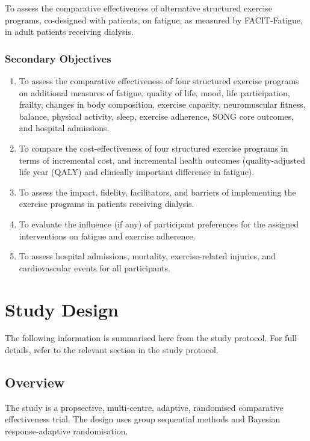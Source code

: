 \documentclass[11pt,parskip=half-]{scrartcl}
\begin{document}
To assess the comparative effectiveness of alternative structured exercise programs, co-designed with patients, on fatigue, as measured by FACIT-Fatigue, in adult patients receiving dialysis.

\subsubsection{Secondary Objectives}
\label{secondary-objectives}

\begin{enumerate}
  \def\labelenumi{\arabic{enumi}.}
  \item To assess the comparative effectiveness of four structured exercise programs on additional measures of fatigue, quality of life, mood, life participation, frailty, changes in body composition, exercise capacity, neuromuscular fitness, balance, physical activity, sleep, exercise adherence, SONG core outcomes, and hospital admissions.
  \item To compare the cost-effectiveness of four structured exercise programs in terms of incremental cost, and incremental health outcomes (quality-adjusted life year (QALY) and clinically important difference in fatigue).
  \item To assess the impact, fidelity, facilitators, and barriers of implementing the exercise programs in patients receiving dialysis.
  \item To evaluate the influence (if any) of participant preferences for the assigned interventions on fatigue and exercise adherence.
  \item To assess hospital admissions, mortality, exercise-related injuries, and cardiovascular events for all participants.
\end{enumerate}

\clearpage

\section{Study Design}\label{study-design}

The following information is summarised here from the study protocol. For full details, refer to the relevant section in the study protocol.

\subsection{Overview}\label{overview}

The study is a propsective, multi-centre, adaptive, randomised comparative effectiveness trial. The design uses group sequential methods and Bayesian response-adaptive randomisation.
\end{document}
